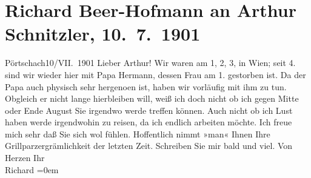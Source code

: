 

         
         \renewcommand{\erwaehntePersonen}{Personen: Hermann Beer, Rosa Beer, Richard Beer-Hofmann, Franz Grillparzer}
         \renewcommand{\erwaehnteOrte}{Orte: Pörtschach, Wien}
         \renewcommand{\erwaehnteWerke}{}
               \section[Richard Beer-Hofmann an Arthur Schnitzler, 10. 7. 1901]{ Richard Beer-Hofmann an Arthur Schnitzler, 10. 7. 1901}\nopagebreak{}\rehead{ }\begin{ledgroupsized}[t]{13cm}\normalsize\beginnumbering \toendnotes[C]{\smallbreak\pagebreak[2]} 
\toendnotes[C]{\smallbreak}\pstart
           \raggedleft{}{\pb}Pörtschach10/VII. 1901\pend
           \pstart
           Lieber Arthur! Wir waren am 1, 2,
                  3, in Wien; seit 4.
               sind wir wieder hier mit Papa Hermann, dessen
                  Frau am 1.
               gestorben ist. Da der Papa
               auch physisch sehr hergeno{\geminationm}en ist, haben wir vorläufig
               mit ihm zu tun. Obgleich er nicht lange hierbleiben will, weiß ich doch nicht ob ich
               gegen Mitte oder Ende August Sie irgendwo werde treffen
               können.\pend
           \pstart
           {\pb}Auch nicht ob ich Lust haben werde
               irgendwohin zu reisen, da ich endlich arbeiten möchte. Ich freue mich sehr daß Sie
               sich wol fühlen. Hoffentlich nimmt »man« Ihnen Ihre Grillparzergrämlichkeit der letzten Zeit. Schreiben Sie mir bald und
               viel.\pend
           \pstart
           Von Herzen Ihr{\\[\baselineskip]}\spacefill\mbox{Richard}\pend
           \leftskip=0em{}
         
         \endnumbering{}\end{ledgroupsized}  \newcommand{\dateiname}{L01144}\newcommand{\titel}{Richard Beer-Hofmann an Arthur Schnitzler, 10. 7. 1901}\newcommand{\editorInnen}{Martin Anton Müller und Gerd-Hermann Susen}
      